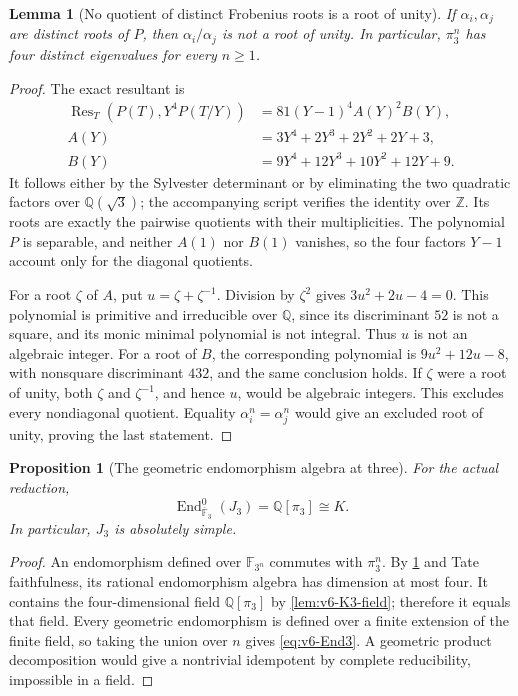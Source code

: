 \documentclass[11pt]{article}
\newtheorem{proposition}[proposition]{Proposition}
\newtheorem{lemma}[lemma]{Lemma}
\theoremstyle{definition}
\theoremstyle{remark}
\newcommand{\F}{\mathbb F}
\newcommand{\Q}{\mathbb Q}
\newcommand{\Z}{\mathbb Z}
\newcommand{\End}{\operatorname{End}}
\begin{document}
\begin{lemma}[No quotient of distinct Frobenius roots is a root of unity]
\label{lem:v6-root-ratios}
If $\alpha_i,\alpha_j$ are distinct roots of $P$, then
$\alpha_i/\alpha_j$ is not a root of unity. In particular,
$\pi_3^n$ has four distinct eigenvalues for every $n\ge1$.
\end{lemma}
\begin{proof}
The exact resultant is
\begin{align}
 \operatorname{Res}_T(P(T),Y^4P(T/Y))
 &=81(Y-1)^4 A(Y)^2B(Y),\\
 A(Y)&=3Y^4+2Y^3+2Y^2+2Y+3,\\
 B(Y)&=9Y^4+12Y^3+10Y^2+12Y+9.
 \label{eq:v6-resultant}
\end{align}
It follows either by the Sylvester determinant or by eliminating the two
quadratic factors over $\Q(\sqrt3)$; the accompanying script verifies
the identity over $\Z$. Its roots are exactly the pairwise quotients
with their multiplicities. The polynomial $P$ is separable, and neither
$A(1)$ nor $B(1)$ vanishes, so the four factors $Y-1$ account only for
the diagonal quotients.

For a root $\zeta$ of $A$, put $u=\zeta+\zeta^{-1}$. Division by
$\zeta^2$ gives $3u^2+2u-4=0$. This polynomial is primitive and
irreducible over $\Q$, since its discriminant $52$ is not a square,
and its monic minimal polynomial is not integral. Thus $u$ is not an
algebraic integer. For a root of $B$, the corresponding polynomial is
$9u^2+12u-8$, with nonsquare discriminant $432$, and the same conclusion
holds. If $\zeta$ were a root of unity, both $\zeta$ and $\zeta^{-1}$,
and hence $u$, would be algebraic integers. This excludes every
nondiagonal quotient. Equality $\alpha_i^n=\alpha_j^n$ would give an
excluded root of unity, proving the last statement.
\end{proof}

\begin{proposition}[The geometric endomorphism algebra at three]
\label{prop:v6-End3}
For the actual reduction,
\begin{equation}
 \boxed{\End^0_{\overline{\F}_3}(J_3)=\Q[\pi_3]\cong K.}
 \label{eq:v6-End3}
\end{equation}
In particular, $J_3$ is absolutely simple.
\end{proposition}
\begin{proof}
An endomorphism defined over $\F_{3^n}$ commutes with $\pi_3^n$.
By \cref{lem:v6-root-ratios} and Tate faithfulness, its rational
endomorphism algebra has dimension at most four. It contains the
four-dimensional field $\Q[\pi_3]$ by
\cref{lem:v6-K3-field}; therefore it equals that field.
Every geometric endomorphism is defined over a finite extension of the
finite field, so taking the union over $n$ gives
\eqref{eq:v6-End3}. A geometric product decomposition would give a
nontrivial idempotent by complete reducibility, impossible in a field.
\end{proof}
\end{document}
